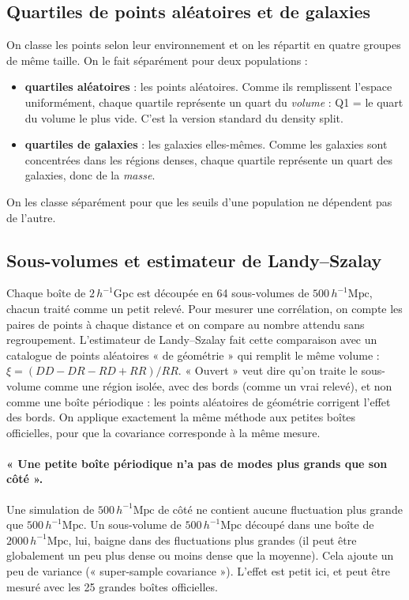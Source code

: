 \documentclass[11pt]{article}
\newcommand{\Mpch}{\,h^{-1}\mathrm{Mpc}}
\begin{document}
\subsection{Quartiles de points aléatoires et de galaxies}
On classe les points selon leur environnement et on les répartit en quatre groupes de même taille. On le fait séparément pour deux populations :
\begin{itemize}
\item \textbf{quartiles aléatoires} : les points aléatoires. Comme ils remplissent l'espace uniformément, chaque quartile représente un quart du \emph{volume} : Q1 = le quart du volume le plus vide. C'est la version standard du density split.
\item \textbf{quartiles de galaxies} : les galaxies elles-mêmes. Comme les galaxies sont concentrées dans les régions denses, chaque quartile représente un quart des galaxies, donc de la \emph{masse}.
\end{itemize}
On les classe séparément pour que les seuils d'une population ne dépendent pas de l'autre.

\subsection{Sous-volumes et estimateur de Landy--Szalay}
Chaque boîte de $2\,h^{-1}$Gpc est découpée en 64 sous-volumes de $500\Mpch$, chacun traité comme un petit relevé. Pour mesurer une corrélation, on compte les paires de points à chaque distance et on compare au nombre attendu sans regroupement. L'estimateur de Landy--Szalay fait cette comparaison avec un catalogue de points aléatoires « de géométrie » qui remplit le même volume :
$\xi=(DD-DR-RD+RR)/RR$. « Ouvert » veut dire qu'on traite le sous-volume comme une région isolée, avec des bords (comme un vrai relevé), et non comme une boîte périodique : les points aléatoires de géométrie corrigent l'effet des bords. On applique exactement la même méthode aux petites boîtes officielles, pour que la covariance corresponde à la même mesure.

\paragraph{« Une petite boîte périodique n'a pas de modes plus grands que son côté ».} Une simulation de $500\Mpch$ de côté ne contient aucune fluctuation plus grande que $500\Mpch$. Un sous-volume de $500\Mpch$ découpé dans une boîte de $2000\Mpch$, lui, baigne dans des fluctuations plus grandes (il peut être globalement un peu plus dense ou moins dense que la moyenne). Cela ajoute un peu de variance (« super-sample covariance »). L'effet est petit ici, et peut être mesuré avec les 25 grandes boîtes officielles.
\end{document}
